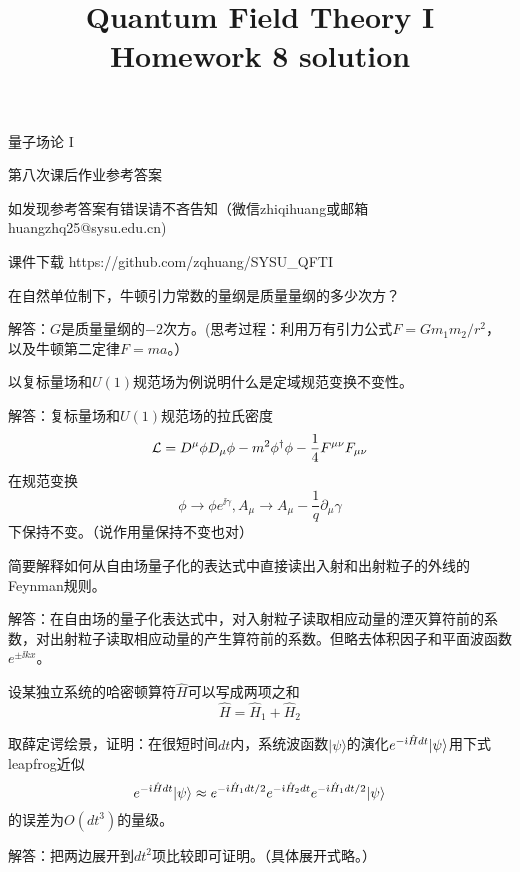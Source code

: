\documentclass[CJK]{beamer}
\title{Quantum Field Theory I \\ Homework 8 solution}
\author{}
\date{}
\begin{document}
\begin{frame}
 
\begin{center}
\begin{Large}
\bch
量子场论 I 

{\vskip 0.3in}

第八次课后作业参考答案
\skipline
\skipline

如发现参考答案有错误请不吝告知（微信zhiqihuang或邮箱huangzhq25@sysu.edu.cn)
\ech
\end{Large}
\end{center}

\vskip 0.2in

\bch
课件下载
\ech
https://github.com/zqhuang/SYSU\_QFTI

\end{frame}

\begin{frame}
\bch
{\small
在自然单位制下，牛顿引力常数的量纲是质量量纲的多少次方？

\skipline

解答：$G$是质量量纲的$-2$次方。(思考过程：利用万有引力公式$F = Gm_1m_2/r^2$，以及牛顿第二定律$F=m a$。）
}

\ech
\end{frame}

\begin{frame}
\bch
{\small
以复标量场和$U(1)$规范场为例说明什么是定域规范变换不变性。

\skipline

解答：复标量场和$U(1)$规范场的拉氏密度
$${\mathcal{L}} = D^\mu\phi D_\mu\phi -m^2\phi^\dagger\phi - \frac{1}{4}{F^{\mu\nu}}{F_{\mu\nu}}$$
在规范变换
$$\phi \rightarrow \phi e^{\ii \gamma}, A_\mu \rightarrow A_\mu - \frac{1}{q}\partial_\mu \gamma$$
下保持不变。（说作用量保持不变也对）
}
\ech
\end{frame}

\begin{frame}
\bch
{\small
简要解释如何从自由场量子化的表达式中直接读出入射和出射粒子的外线的Feynman规则。

\skipline

解答：在自由场的量子化表达式中，对入射粒子读取相应动量的湮灭算符前的系数，对出射粒子读取相应动量的产生算符前的系数。但略去体积因子和平面波函数$e^{\pm \ii kx}$。
}
\ech
\end{frame}


\begin{frame}
\bch
{\small
设某独立系统的哈密顿算符$\hat{H}$可以写成两项之和
$$\hat{H} = \hat{H}_1 + \hat{H}_2$$


取薛定谔绘景，证明：在很短时间$dt$内，系统波函数$|\psi\rangle$的演化$e^{-{\dot{\imath}} {\hat{H}} dt} |\psi\rangle$用下式leapfrog近似
$$ e^{-{\dot{\imath}} {\hat{H}} dt} |\psi \rangle  \approx e^{-{\dot{\imath}} {\hat{H}}_1 dt/2}e^{-{\dot{\imath}} {\hat{H}}_2 dt}e^{-{\dot{\imath}} {\hat{H}}_1 dt/2} | \psi \rangle $$
的误差为$O(dt^3)$的量级。

\skipline
解答：把两边展开到$dt^2$项比较即可证明。（具体展开式略。）
}


\ech
\end{frame}
\end{document}
